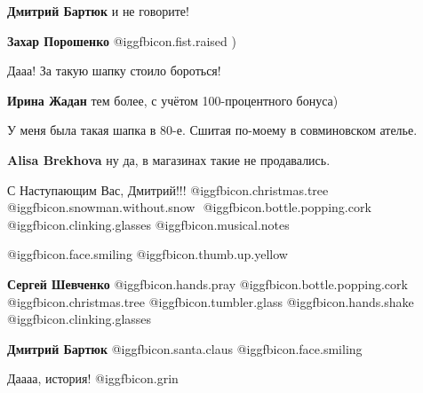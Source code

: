 \begin{itemize}
\begin{itemize}
\textbf{Дмитрий Бартюк} и не говорите!

\textbf{Захар Порошенко}  @igg{fbicon.fist.raised} )
\end{itemize} %

Дааа! За такую шапку стоило бороться!

\textbf{Ирина Жадан} тем более, с учётом 100-процентного бонуса)

У меня была такая шапка в 80-е. Сшитая по-моему в совминовском ателье.

\textbf{Alisa Brekhova} ну да, в магазинах такие не продавались.

С Наступающим Вас, Дмитрий!!! @igg{fbicon.christmas.tree}  @igg{fbicon.snowman.without.snow} ️ @igg{fbicon.bottle.popping.cork}  @igg{fbicon.clinking.glasses}  @igg{fbicon.musical.notes} 

@igg{fbicon.face.smiling} @igg{fbicon.thumb.up.yellow} 

\begin{itemize} %
\textbf{Сергей Шевченко}  @igg{fbicon.hands.pray}   @igg{fbicon.bottle.popping.cork}   @igg{fbicon.christmas.tree}   @igg{fbicon.tumbler.glass}   @igg{fbicon.hands.shake}   @igg{fbicon.clinking.glasses} 

\textbf{Дмитрий Бартюк}  @igg{fbicon.santa.claus} @igg{fbicon.face.smiling}
\end{itemize} %

Даааа, история! @igg{fbicon.grin} 


\end{itemize} %

